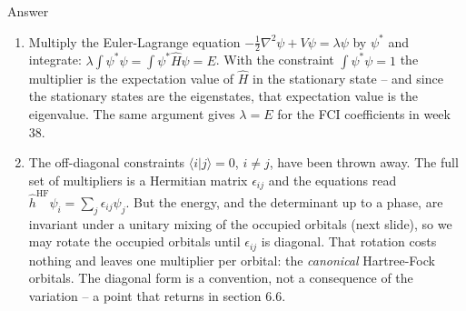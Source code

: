 \documentclass[aspectratio=169,10pt]{beamer}
\newcounter{thinkctr}
\newcommand{\thinka}[1]{%
  \begin{tcolorbox}[colback=paleteal,colframe=teal,title={\bfseries Answer to pause \#\thethinkctr}]
  #1
  \end{tcolorbox}}
\newcommand{\braket}[2]{\langle #1\vert #2\rangle}
\begin{document}
\begin{frame}{Answer}
  \thinka{
  \begin{enumerate}
    \item Multiply the Euler-Lagrange equation $-\frac12\nabla^2\psi+V\psi=\lambda\psi$ by $\psi^{*}$ and integrate: $\lambda\int\psi^{*}\psi=\int\psi^{*}\hat{H}\psi=E$. With the constraint $\int\psi^{*}\psi=1$ the multiplier is the expectation value of $\hat{H}$ in the stationary state -- and since the stationary states are the eigenstates, that expectation value is the eigenvalue. The same argument gives $\lambda=E$ for the FCI coefficients in week 38.
    \item The off-diagonal constraints $\braket{i}{j}=0$, $i\ne j$, have been thrown away. The full set of multipliers is a Hermitian matrix $\epsilon_{ij}$ and the equations read $\hat{h}^{\mathrm{HF}}\psi_i=\sum_j\epsilon_{ij}\psi_j$. But the energy, and the determinant up to a phase, are invariant under a unitary mixing of the occupied orbitals (next slide), so we may rotate the occupied orbitals until $\epsilon_{ij}$ is diagonal. That rotation costs nothing and leaves one multiplier per orbital: the \emph{canonical} Hartree-Fock orbitals. The diagonal form is a convention, not a consequence of the variation -- a point that returns in section 6.6.
  \end{enumerate}}
\end{frame}
\end{document}
